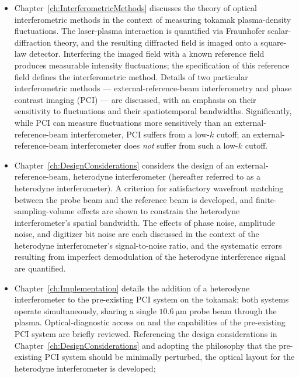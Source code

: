 \begin{itemize}
  \item Chapter~\ref{ch:InterferometricMethods} discusses
    the theory of optical interferometric methods
    in the context of measuring tokamak plasma-density fluctuations.
    The laser-plasma interaction is quantified via
    Fraunhofer scalar-diffraction theory, and
    the resulting diffracted field is imaged onto a square-law detector.
    Interfering the imaged field with a known reference field
    produces measurable intensity fluctuations;
    the specification of this reference field
    defines the interferometric method.
    Details of two particular interferometric methods ---
    external-reference-beam interferometry and
    phase contrast imaging (PCI) ---
    are discussed, with an emphasis on
    their sensitivity to fluctuations and their spatiotemporal bandwidths.
    Significantly, while PCI can measure fluctuations more sensitively
    than an external-reference-beam interferometer,
    PCI suffers from a low-$k$ cutoff;
    an external-reference-beam interferometer
    does \emph{not} suffer from such a low-$k$ cutoff.
  \item Chapter~\ref{ch:DesignConsiderations} considers the design of an
    external-reference-beam, heterodyne interferometer
    (hereafter referred to as a heterodyne interferometer).
    A criterion for satisfactory wavefront matching
    between the probe beam and the reference beam is developed, and
    finite-sampling-volume effects are shown
    to constrain the heterodyne interferometer's spatial bandwidth.
    The effects of phase noise, amplitude noise, and digitizer bit noise
    are each discussed in the context of
    the heterodyne interferometer's signal-to-noise ratio, and
    the systematic errors resulting from
    imperfect demodulation of the heterodyne interference signal
    are quantified.
  \item Chapter~\ref{ch:Implementation} details
    the addition of a heterodyne interferometer
    to the pre-existing PCI system on the \diiid\space tokamak;
    both systems operate simultaneously,
    sharing a single $\SI{10.6}{\micro\meter}$ probe beam through the plasma.
    Optical-diagnostic access on \diiid\space and the capabilities
    of the pre-existing PCI system are briefly reviewed.
    Referencing the design considerations
    in Chapter~\ref{ch:DesignConsiderations} and
    adopting the philosophy
    that the pre-existing PCI system should be minimally perturbed,
    the optical layout for the heterodyne interferometer is developed;

\end{itemize}
